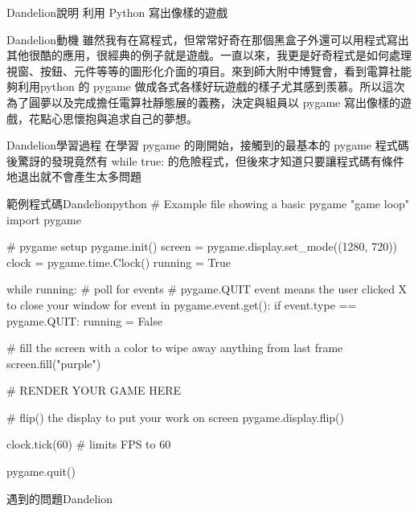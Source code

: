 \documentclass{article}
\begin{document}

\begin{large}
\begin{boxpar}{Dandelion}{說明}
利用 Python 寫出像樣的遊戲
\end{boxpar}
\begin{boxpar}{Dandelion}{動機}
雖然我有在寫程式，但常常好奇在那個黑盒子外還可以用程式寫出其他很酷的應用，很經典的例子就是遊戲。一直以來，我更是好奇程式是如何處理視窗、按鈕、元件等等的圖形化介面的項目。來到師大附中博覽會，看到電算社能夠利用python
的 pygame
做成各式各樣好玩遊戲的樣子尤其感到羨慕。所以這次為了圓夢以及完成擔任電算社靜態展的義務，決定與組員以
pygame 寫出像樣的遊戲，花點心思懷抱與追求自己的夢想。
\end{boxpar}
    \begin{boxpar}{Dandelion}{學習過程}
        在學習 pygame 的剛開始，接觸到的最基本的 pygame 程式碼後驚訝的發現竟然有 while true:
        的危險程式，但後來才知道只要讓程式碼有條件地退出就不會產生太多問題
        \begin{mintbox}{範例程式碼}{Dandelion}{python}
# Example file showing a basic pygame "game loop"
import pygame

# pygame setup
pygame.init()
screen = pygame.display.set_mode((1280, 720))
clock = pygame.time.Clock()
running = True

while running:
    # poll for events
    # pygame.QUIT event means the user clicked X to close your window
    for event in pygame.event.get():
        if event.type == pygame.QUIT:
            running = False

    # fill the screen with a color to wipe away anything from last frame
    screen.fill("purple")

    # RENDER YOUR GAME HERE

    # flip() the display to put your work on screen
    pygame.display.flip()

    clock.tick(60)  # limits FPS to 60

pygame.quit()
        \end{mintbox}
    \end{boxpar}
\begin{boxpar}{遇到的問題}{Dandelion}

\end{boxpar}
\end{large}
\end{document}
